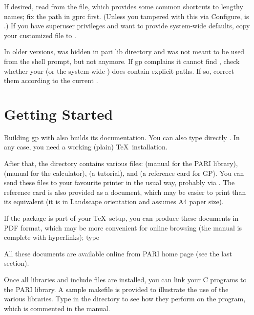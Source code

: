 If desired, read   from the 
file, which provides some common shortcuts to lengthy names; fix the path in
gprc first. (Unless you tampered with this via Configure,  is
.) If you have superuser privileges and want to
provide system-wide defaults, copy your customized  file to
.

In older versions,  was hidden in pari lib directory and was not
meant to be used from the shell prompt, but not anymore. If gp complains it
cannot find , check whether your  (or the system-wide
) does contain explicit paths. If so, correct them according to the
current .

\section{Getting Started}

 Building gp with  also builds
its documentation. You can also type directly . In any case,
you need a working (plain) \TeX\ installation.

After that, the  directory contains various  files:
 (manual for the PARI library),  (manual
for the  calculator),  (a tutorial), and
 (a reference card for GP). You can send these files to your
favourite printer in the usual way, probably via . The reference
card is also provided as a  document, which may be easier to
print than its  equivalent (it is in Landscape orientation and
assumes A4 paper size).

\noindent If the  package is part of your \TeX\ setup, you can
produce these documents in PDF format, which may be more convenient for
online browsing (the manual is complete with hyperlinks); type


\noindent All these documents are available online from PARI home page
(see the last section).

 Once all libraries and include files are installed,
you can link your C programs to the PARI library. A sample makefile
 is provided to illustrate the use of the various
libraries. Type  in the  directory to see how
they perform on the  program, which is commented in the
manual. 

